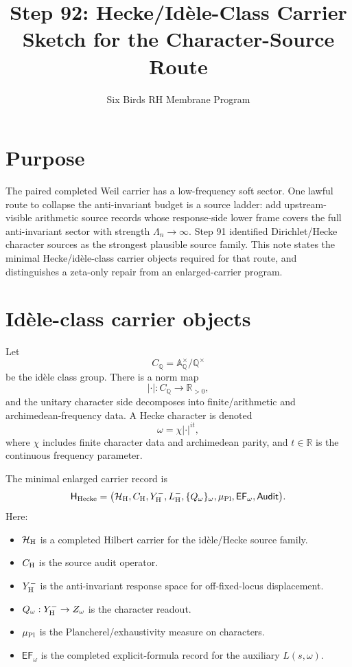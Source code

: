 \documentclass[11pt]{article}
\title{Step 92: Hecke/Id\`ele-Class Carrier Sketch for the Character-Source Route}
\author{Six Birds RH Membrane Program}
\date{}
\newcommand{\A}{\mathbb A}
\newcommand{\Q}{\mathbb Q}
\newcommand{\R}{\mathbb R}
\newcommand{\cH}{\mathcal H}
\begin{document}
\maketitle

\section{Purpose}
The paired completed Weil carrier has a low-frequency soft sector.  One lawful route to collapse the anti-invariant budget is a source ladder: add upstream-visible arithmetic source records whose response-side lower frame covers the full anti-invariant sector with strength \(\Lambda_n\to\infty\).  Step 91 identified Dirichlet/Hecke character sources as the strongest plausible source family.  This note states the minimal Hecke/id\`ele-class carrier objects required for that route, and distinguishes a zeta-only repair from an enlarged-carrier program.

\section{Id\`ele-class carrier objects}
Let
\[
  C_\Q=\A_\Q^\times/\Q^\times
\]
be the id\`ele class group.  There is a norm map
\[
  |\cdot|:C_\Q\to \R_{>0},
\]
and the unitary character side decomposes into finite/arithmetic and archimedean-frequency data.  A Hecke character is denoted
\[
  \omega=\chi |\cdot|^{it},
\]
where \(\chi\) includes finite character data and archimedean parity, and \(t\in\R\) is the continuous frequency parameter.

The minimal enlarged carrier record is
\[
  \mathsf H_{\rm Hecke}
  =\bigl(\cH_{\rm H},C_{\rm H},Y^-_{\rm H},L^-_{\rm H},\{Q_\omega\}_{\omega},\mu_{\rm Pl},\mathsf{EF}_{\omega},\mathsf{Audit}\bigr).
\]
Here:
\begin{itemize}[leftmargin=2em]
\item \(\cH_{\rm H}\) is a completed Hilbert carrier for the id\`ele/Hecke source family.
\item \(C_{\rm H}\) is the source audit operator.
\item \(Y^-_{\rm H}\) is the anti-invariant response space for off-fixed-locus displacement.
\item \(Q_\omega:Y^-_{\rm H}\to Z_\omega\) is the character readout.
\item \(\mu_{\rm Pl}\) is the Plancherel/exhaustivity measure on characters.
\item \(\mathsf{EF}_\omega\) is the completed explicit-formula record for the auxiliary \(L(s,\omega)\).
\end{itemize}
\end{document}
